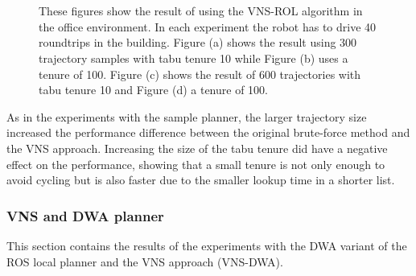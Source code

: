 \begin{figure}[thpb]
   \myfloatalign
    \tiny
    \centering
    
    \\
    \\
    {
    \captionsetup[subfigure]{labelformat=empty} 
    }


    \caption[Experiment: VNS-ROL office]{These figures show the result of using the VNS-ROL algorithm in the office environment. In each experiment the robot has to drive 40 roundtrips in the building. Figure (a) shows the result using 300 trajectory samples with tabu tenure 10 while Figure (b) uses a tenure of 100. Figure (c) shows the result of 600 trajectories with tabu tenure 10 and Figure (d) a tenure of 100.}  
     \label{fig:fig_gh25_rol}
\end{figure} 

As in the experiments with the sample planner, the larger trajectory size increased the performance difference between the original brute-force method and the VNS approach.
Increasing the size of the tabu tenure did have a negative effect on the performance, showing that a small tenure is not only enough to avoid cycling but is also faster due to the smaller lookup time in a shorter list.
 
\subsubsection{VNS and DWA planner}
This section contains the results of the experiments with the DWA variant of the ROS local planner and the VNS approach (VNS-DWA).

